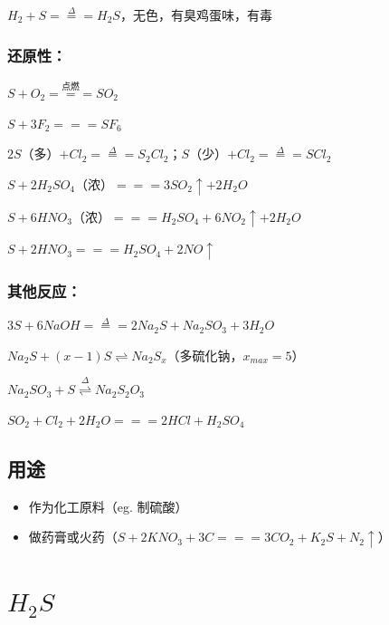 \documentclass[UTF8,zihao=-4,openany]{ctexbook}
\begin{document}
$H_2+S\stackrel{\Delta}{=\!=\!=}H_2S$，无色，有臭鸡蛋味，有毒\par
\subsubsection{还原性：}
$S+O_2\stackrel{\mbox{点燃}}{=\!=\!=}SO_2$\par

$S+3F_2=\!=\!=SF_6$\par

$2S$（多）$+Cl_2\stackrel{\Delta}{=\!=\!=}S_2Cl_2$；$S$（少）$+Cl_2\stackrel{\Delta}{=\!=\!=}SCl_2$\par

$S+2H_2SO_4$（浓）$=\!=\!=3SO_2\uparrow+2H_2O$\par

$S+6HNO_3$（浓）$=\!=\!=H_2SO_4+6NO_2\uparrow+2H_2O$\par

$S+2HNO_3=\!=\!=H_2SO_4+2NO\uparrow$\par
\subsubsection{其他反应：}
$3S+6NaOH\stackrel{\Delta}{=\!=\!=}2Na_2S+Na_2SO_3+3H_2O$\par

$Na_2S+(x-1)S\rightleftharpoons Na_2S_x$（多硫化钠，$x_{max}=5$）\par

$Na_2SO_3+S\stackrel{\Delta}{\rightleftharpoons}Na_2S_2O_3$\par

$SO_2+Cl_2+2H_2O=\!=\!=2HCl+H_2SO_4$\par
\subsection{用途}
\begin{itemize}
\item 作为化工原料（eg. 制硫酸）
\end{itemize}

\begin{itemize}
\item 做药膏或火药（$S+2KNO_3+3C=\!=\!=3CO_2+K_2S+N_2\uparrow$）
\end{itemize}

\section{$H_2S$}
\end{document}
